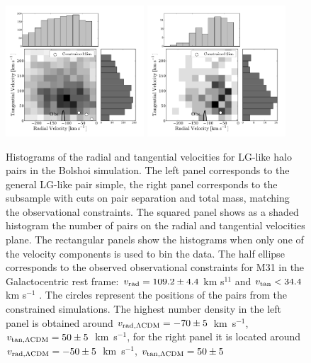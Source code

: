 \documentclass{emulateapj}
\newcommand{\kms}{\,km~s$^{-1}$}
\begin{document}
\begin{figure}
\begin{center}
\includegraphics[keepaspectratio=true,width=0.46\textwidth]{./figures/test_rt_BDM.pdf}
\includegraphics[keepaspectratio=true,width=0.46\textwidth]{./figures/test_rt_BDM_narrow.pdf}
\caption{Histograms of the radial and tangential velocities for LG-like halo pairs in the Bolshoi simulation. The left panel corresponds to the general LG-like pair simple, the right panel corresponds to the subsample with cuts on pair separation and total mass, matching the observational constraints. The squared panel shows as a shaded histogram the number of pairs on the radial and tangential velocities plane. The rectangular panels show the histograms when only one of the velocity components is used to bin the data. The half ellipse corresponds to the observed observational constraints for M31 in the Galactocentric rest frame: $v_{\rm rad}=109.2\pm 4.4$ km s$^{11}$ and $v_{\rm tan}< 34.4$ km s$^{-1}$ \citep{vanderMarel12}. The circles represent the positions of the pairs from the constrained simulations. The highest number density in the left panel is obtained around $v_{\rm rad,\Lambda CDM} = -70\pm5$ \kms, $v_{\rm tan,\Lambda CDM} = 50\pm5$ \kms, for the right panel it is located around $v_{\rm rad,\Lambda CDM} = -50\pm5$ \kms, $v_{\rm tan,\Lambda CDM} = 50\pm5$ }
\label{fig:rt}
\end{center}

\end{figure}
\end{document}
